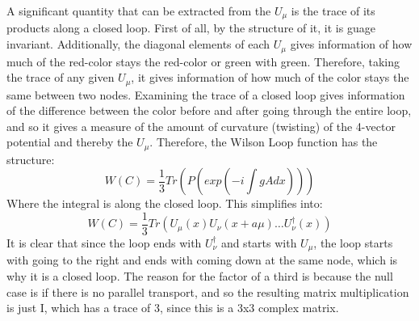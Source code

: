 \documentclass{article}
\begin{document}
A significant quantity that can be extracted from the $U_{\mu}$ is the trace of its products along a closed loop. First of all, by the structure of it, it is guage invariant. 
Additionally, the diagonal elements of each $U_{\mu}$ gives information of how much of the red-color stays the red-color or green with green. Therefore, taking the trace of any given $U_{\mu}$, it gives information of how much of the color stays the same between two nodes. 
Examining the trace of a closed loop gives information of the difference between the color before and after going through the entire loop, and so it gives a measure of the amount of curvature (twisting) of the 4-vector potential and thereby the $U_{\mu}$.
Therefore, the Wilson Loop function has the structure: 
\begin{equation}
    W(C) = \frac{1}{3}Tr(P(exp(-i \int gAdx)))
\end{equation}
Where the integral is along the closed loop. This simplifies into: 
\begin{equation}
    W(C) = \frac{1}{3}Tr(U_{\mu}(x)U_{\nu}(x + a\mu)\dots U^{\dag}_{\nu}(x))
\end{equation}
It is clear that since the loop ends with $U^{\dag}_{\nu}$ and starts with $U_{\mu}$, the loop starts with going to the right and ends with coming down at the same node, which is why it is a closed loop.
The reason for the factor of a third is because the null case is if there is no parallel transport, and so the resulting matrix multiplication is just I, which has a trace of 3, since this is a 3x3 complex matrix. \newline
\end{document}

